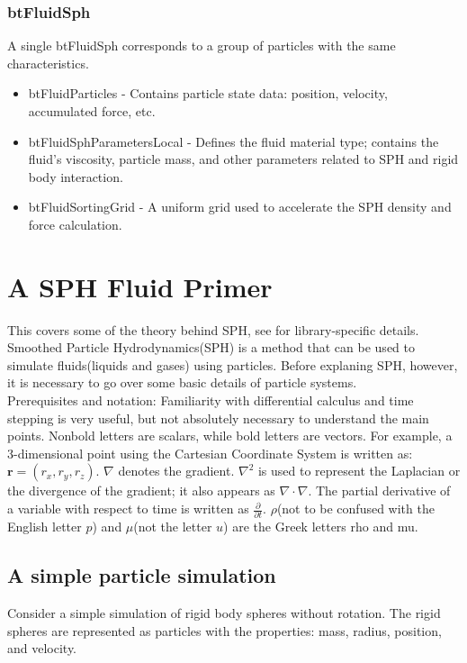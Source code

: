 \documentclass[]{article}
\begin{document}
		\subsubsection{btFluidSph}
			A single btFluidSph corresponds to a group of particles with the same characteristics.
			\begin{itemize}
				\item btFluidParticles - Contains particle state data: position, velocity, accumulated force, etc.
				\item btFluidSphParametersLocal - Defines the fluid material type; contains the fluid's viscosity, 
				particle mass, and other parameters related to SPH and rigid body interaction.
				\item btFluidSortingGrid - A uniform grid used to accelerate the SPH density and force calculation.
			\end{itemize}
			
\pagebreak
\section{A SPH Fluid Primer}
	
	This covers some of the theory behind SPH, see  for library-specific details.\\
	
	Smoothed Particle Hydrodynamics(SPH) is a method that can be used to simulate fluids(liquids and gases) using 
	particles. Before explaning SPH, however, it is necessary to go over some basic details of particle systems.\\
	
	Prerequisites and notation: Familiarity with differential calculus and time stepping is very useful, but not 
	absolutely necessary to understand the main points. Nonbold letters are scalars, while bold letters are vectors. 
	For example, a 3-dimensional point using the Cartesian Coordinate System is written as: 
	\( \mathbf{r} = (r_x, r_y, r_z) \). \( \nabla \) denotes the gradient. \(\nabla ^2\) is used to represent the 
	Laplacian or the divergence of the gradient; it also appears as \(\nabla \cdot \nabla\). The partial derivative of 
	a variable with respect to time is written as \( \frac{\partial}{\partial t} \). \(\rho\)(not to be confused with the
	English letter \(p\)) and \(\mu\)(not the letter \(u\)) are the Greek letters rho and mu.\\
	
	\subsection{A simple particle simulation}
	Consider a simple simulation of rigid body spheres without rotation. The rigid spheres are represented as particles
	with the properties: mass, radius, position, and velocity. 
	
\end{document}

